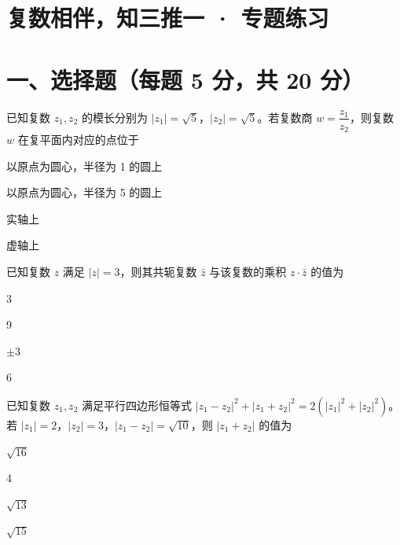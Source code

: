 \documentclass{exam-zh}
\begin{document}
\section*{复数相伴，知三推一 · 专题练习}

\section*{一、选择题（每题 5 分，共 20 分）}


\begin{question}[points=5]
  已知复数 $z_1, z_2$ 的模长分别为 $|z_1| = \sqrt{5}$，$|z_2| = \sqrt{5}$。若复数商 $w = \dfrac{z_1}{z_2}$，则复数 $w$ 在复平面内对应的点位于
  \begin{choices}
    \item 以原点为圆心，半径为 1 的圆上
    \item 以原点为圆心，半径为 5 的圆上
    \item 实轴上
    \item 虚轴上
  \end{choices}
\end{question}



\begin{question}[points=5]
  已知复数 $z$ 满足 $|z| = 3$，则其共轭复数 $\bar{z}$ 与该复数的乘积 $z \cdot \bar{z}$ 的值为
  \begin{choices}
    \item 3
    \item 9
    \item $\pm 3$
    \item 6
  \end{choices}
\end{question}



\begin{question}[points=5]
  已知复数 $z_1, z_2$ 满足平行四边形恒等式 $|z_1 - z_2|^2 + |z_1 + z_2|^2 = 2(|z_1|^2 + |z_2|^2)$。若 $|z_1| = 2$，$|z_2| = 3$，$|z_1 - z_2| = \sqrt{10}$，则 $|z_1 + z_2|$ 的值为
  \begin{choices}
    \item $\sqrt{16}$
    \item 4
    \item $\sqrt{13}$
    \item $\sqrt{15}$
  \end{choices}
\end{question}
\end{document}
